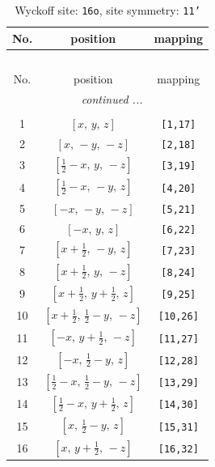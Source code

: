 \documentclass[fleqn,8pt]{jsarticle}
\begin{document}
\begin{longtable}{ccc}
\caption{Wyckoff site: {\tt 16o}, site symmetry: {\tt 11'}}
 \\
 \hline \hline
No. & position & mapping \\ \hline \endfirsthead

\multicolumn{2}{l}{\tablename\ \thetable{}} \\
 \hline \hline
No. & position & mapping \\ \hline \endhead

 \hline \hline
\multicolumn{2}{r}{\footnotesize\it continued ...} \\ \endfoot

 \hline \hline
\multicolumn{2}{r}{} \\ \endlastfoot

1 & $\left[ x,\, y,\, z \right]$ & {\tt [1,17]} \\ \hline
2 & $\left[ x,\, - y,\, - z \right]$ & {\tt [2,18]} \\ \hline
3 & $\left[ \frac{1}{2} - x,\, y,\, - z \right]$ & {\tt [3,19]} \\ \hline
4 & $\left[ \frac{1}{2} - x,\, - y,\, z \right]$ & {\tt [4,20]} \\ \hline
5 & $\left[ - x,\, - y,\, - z \right]$ & {\tt [5,21]} \\ \hline
6 & $\left[ - x,\, y,\, z \right]$ & {\tt [6,22]} \\ \hline
7 & $\left[ x + \frac{1}{2},\, - y,\, z \right]$ & {\tt [7,23]} \\ \hline
8 & $\left[ x + \frac{1}{2},\, y,\, - z \right]$ & {\tt [8,24]} \\ \hline
9 & $\left[ x + \frac{1}{2},\, y + \frac{1}{2},\, z \right]$ & {\tt [9,25]} \\ \hline
10 & $\left[ x + \frac{1}{2},\, \frac{1}{2} - y,\, - z \right]$ & {\tt [10,26]} \\ \hline
11 & $\left[ - x,\, y + \frac{1}{2},\, - z \right]$ & {\tt [11,27]} \\ \hline
12 & $\left[ - x,\, \frac{1}{2} - y,\, z \right]$ & {\tt [12,28]} \\ \hline
13 & $\left[ \frac{1}{2} - x,\, \frac{1}{2} - y,\, - z \right]$ & {\tt [13,29]} \\ \hline
14 & $\left[ \frac{1}{2} - x,\, y + \frac{1}{2},\, z \right]$ & {\tt [14,30]} \\ \hline
15 & $\left[ x,\, \frac{1}{2} - y,\, z \right]$ & {\tt [15,31]} \\ \hline
16 & $\left[ x,\, y + \frac{1}{2},\, - z \right]$ & {\tt [16,32]} \\
\end{longtable}
\end{document}
